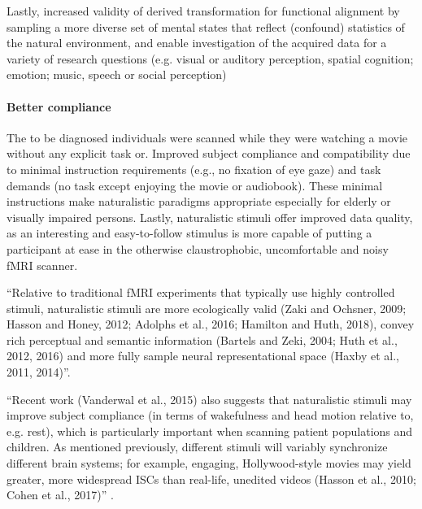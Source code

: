 %
Lastly, increased validity of derived transformation for functional alignment by
sampling a more diverse set of mental states that reflect (confound) statistics
of the natural environment, and enable investigation of the acquired data for a
variety of research questions (e.g. visual or auditory perception, spatial
cognition; emotion; music, speech or social perception)


\paragraph{Better compliance}

%
The to be diagnosed individuals were scanned while they were watching a movie
without any explicit task or.
%
Improved subject compliance and compatibility due to minimal instruction
requirements (e.g., no fixation of eye gaze) and task demands (no task except
enjoying the movie or audiobook).
%
These minimal instructions make naturalistic paradigms appropriate especially
for elderly or visually impaired persons.
%
Lastly, naturalistic stimuli offer improved data quality, as an interesting and
easy-to-follow stimulus is more capable of putting a participant at ease in the
otherwise claustrophobic, uncomfortable and noisy fMRI scanner.

``Relative to traditional fMRI experiments that typically use highly controlled
stimuli, naturalistic stimuli are more ecologically valid (Zaki and Ochsner,
2009; Hasson and Honey, 2012; Adolphs et al., 2016; Hamilton and Huth, 2018),
convey rich perceptual and semantic information (Bartels and Zeki, 2004; Huth et
al., 2012, 2016) and more fully sample neural representational space (Haxby et
al., 2011, 2014)''\citep{nastase2019measuring}.

``Recent work (Vanderwal et al., 2015) also suggests that naturalistic stimuli
may improve subject compliance (in terms of wakefulness and head motion relative
to, e.g. rest), which is particularly important when scanning patient
populations and children. As mentioned previously, different stimuli will
variably synchronize different brain systems; for example, engaging,
Hollywood-style movies may yield greater, more widespread ISCs than real-life,
unedited videos (Hasson et al., 2010; Cohen et al., 2017)''
\citep{nastase2019measuring}.



